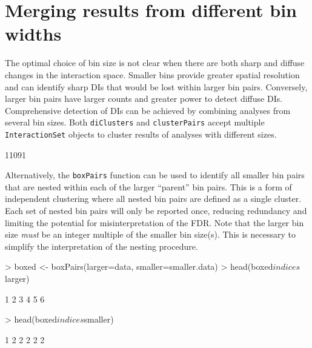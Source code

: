 \documentclass[12pt]{report}
\renewenvironment{Schunk}{\vspace{0pt}}{\vspace{0pt}}
\newcommand{\code}[1]{{\small\texttt{#1}}}
\begin{document}
\section{Merging results from different bin widths}
\label{sec:mergebins}
The optimal choice of bin size is not clear when there are both sharp and diffuse changes in the interaction space.
Smaller bins provide greater spatial resolution and can identify sharp DIs that would be lost within larger bin pairs.
Conversely, larger bin pairs have larger counts and greater power to detect diffuse DIs.
Comprehensive detection of DIs can be achieved by combining analyses from several bin sizes.
Both \code{diClusters} and \code{clusterPairs} accept multiple \code{InteractionSet} objects to cluster results of analyses with different sizes.

\begin{Schunk}
\begin{Soutput}
[1] 11091
\end{Soutput}
\end{Schunk}

Alternatively, the \code{boxPairs} function can be used to identify all smaller bin pairs that are nested within each of the larger ``parent'' bin pairs.
This is a form of independent clustering where all nested bin pairs are defined as a single cluster.
Each set of nested bin pairs will only be reported once, reducing redundancy and limiting the potential for misinterpretation of the FDR.
Note that the larger bin size \textit{must} be an integer multiple of the smaller bin size(s).
This is necessary to simplify the interpretation of the nesting procedure.

\begin{Schunk}
\begin{Sinput}
> boxed <- boxPairs(larger=data, smaller=smaller.data)
> head(boxed$indices$larger)
\end{Sinput}
\begin{Soutput}
[1] 1 2 3 4 5 6
\end{Soutput}
\begin{Sinput}
> head(boxed$indices$smaller)
\end{Sinput}
\begin{Soutput}
[1] 1 2 2 2 2 2
\end{Soutput}
\end{Schunk}
\end{document}
